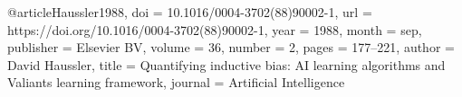 @article{Haussler1988,
  doi = {10.1016/0004-3702(88)90002-1},
  url = {https://doi.org/10.1016/0004-3702(88)90002-1},
  year  = {1988},
  month = {sep},
  publisher = {Elsevier {BV}},
  volume = {36},
  number = {2},
  pages = {177--221},
  author = {David Haussler},
  title = {Quantifying inductive bias: {AI} learning algorithms and Valiant{\textquotesingle}s learning framework},
  journal = {Artificial Intelligence}
}